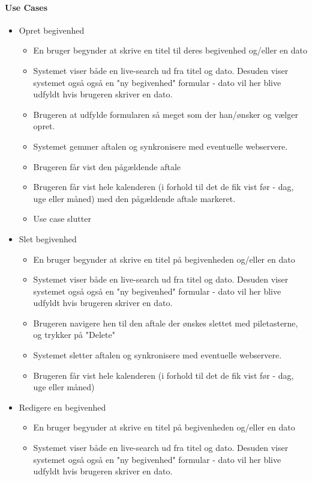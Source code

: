 \documentclass{article}
\begin{document}
   \paragraph{Use Cases}
   \begin{itemize}
   \item Opret begivenhed
   	\begin{itemize}
   	\item En bruger begynder at skrive en titel til deres begivenhed og/eller en dato
   	\item Systemet viser både en live-search ud fra titel og dato. Desuden viser systemet også også en "ny begivenhed" formular - dato vil her blive udfyldt hvis brugeren skriver en dato.
   	
   	\item Brugeren at udfylde formularen så meget som der han/ønsker og vælger opret.
   	\item Systemet gemmer aftalen og synkronisere med eventuelle webservere.
   	\item Brugeren får vist den pågældende aftale
   	\item Brugeren får vist hele kalenderen (i forhold til det de fik vist før - dag, uge eller måned) med den pågældende aftale markeret.
   	\item Use case slutter
   	\end{itemize}
   \item Slet begivenhed
   \begin{itemize}
   	\item En bruger begynder at skrive en titel på begivenheden og/eller en dato
   	\item Systemet viser både en live-search ud fra titel og dato. Desuden viser systemet også også en "ny begivenhed" formular - dato vil her blive udfyldt hvis brugeren skriver en dato.
   	\item Brugeren navigere hen til den aftale der ønskes slettet med piletasterne, og trykker på "Delete"
   	\item Systemet sletter aftalen og synkronisere med eventuelle webservere.
   	\item Brugeren får vist hele kalenderen (i forhold til det de fik vist før - dag, uge eller måned)
   	\end{itemize}
   \item Redigere en begivenhed
    \begin{itemize}
   	\item En bruger begynder at skrive en titel på begivenheden og/eller en dato
   	\item Systemet viser både en live-search ud fra titel og dato. Desuden viser systemet også også en "ny begivenhed" formular - dato vil her blive udfyldt hvis brugeren skriver en dato.

\end{itemize}
\end{itemize}
\end{document}
